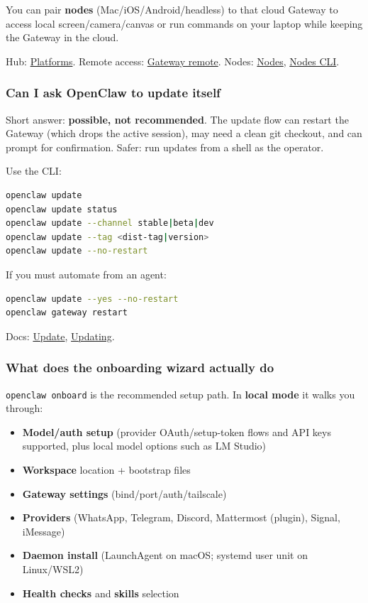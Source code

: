 You can pair \textbf{nodes} (Mac/iOS/Android/headless) to that cloud Gateway to access
local screen/camera/canvas or run commands on your laptop while keeping the
Gateway in the cloud.

Hub: \href{/platforms}{Platforms}. Remote access: \href{/gateway/remote}{Gateway remote}.
Nodes: \href{/nodes}{Nodes}, \href{/cli/nodes}{Nodes CLI}.

\subsubsection{Can I ask OpenClaw to update itself}


Short answer: \textbf{possible, not recommended}. The update flow can restart the
Gateway (which drops the active session), may need a clean git checkout, and
can prompt for confirmation. Safer: run updates from a shell as the operator.

Use the CLI:

\begin{lstlisting}[language=bash]
openclaw update
openclaw update status
openclaw update --channel stable|beta|dev
openclaw update --tag <dist-tag|version>
openclaw update --no-restart
\end{lstlisting}


If you must automate from an agent:

\begin{lstlisting}[language=bash]
openclaw update --yes --no-restart
openclaw gateway restart
\end{lstlisting}


Docs: \href{/cli/update}{Update}, \href{/install/updating}{Updating}.

\subsubsection{What does the onboarding wizard actually do}


\texttt{openclaw onboard} is the recommended setup path. In \textbf{local mode} it walks you through:

\begin{itemize}
  \item \textbf{Model/auth setup} (provider OAuth/setup-token flows and API keys supported, plus local model options such as LM Studio)
  \item \textbf{Workspace} location + bootstrap files
  \item \textbf{Gateway settings} (bind/port/auth/tailscale)
  \item \textbf{Providers} (WhatsApp, Telegram, Discord, Mattermost (plugin), Signal, iMessage)
  \item \textbf{Daemon install} (LaunchAgent on macOS; systemd user unit on Linux/WSL2)
  \item \textbf{Health checks} and \textbf{skills} selection
\end{itemize}


